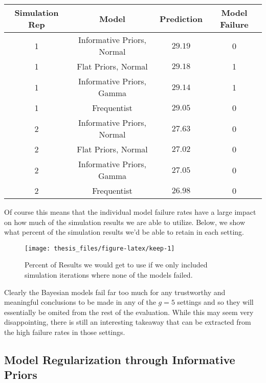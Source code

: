 \documentclass[12pt,twoside]{reedthesis}
\begin{document}
\captionsetup[table]{labelformat=empty,skip=1pt}
\begin{longtable}{cccc}
\toprule
Simulation Rep & Model & Prediction & Model Failure \\ 
\midrule
1 & Informative Priors, Normal & $29.19$ & 0 \\ 
1 & Flat Priors, Normal & $29.18$ & 1 \\ 
1 & Informative Priors, Gamma & $29.14$ & 1 \\ 
1 & Frequentist & $29.05$ & 0 \\ 
2 & Informative Priors, Normal & $27.63$ & 0 \\ 
2 & Flat Priors, Normal & $27.02$ & 0 \\ 
2 & Informative Priors, Gamma & $27.05$ & 0 \\ 
2 & Frequentist & $26.98$ & 0 \\ 
\bottomrule
\end{longtable}
Of course this means that the individual model failure rates have a large impact on how much of the simulation results we are able to utilize. Below, we show what percent of the simulation results we'd be able to retain in each setting.
\begin{figure}

{\centering \texttt{[image: thesis\_files/figure-latex/keep-1]} 

}

\caption{Percent of Results we would get to use if we only included simulation iterations where none of the models failed.}\label{fig:keep}
\end{figure}
Clearly the Bayesian models fail far too much for any trustworthy and meaningful conclusions to be made in any of the \(g = 5\) settings and so they will essentially be omited from the rest of the evaluation. While this may seem very disappointing, there is still an interesting takeaway that can be extracted from the high failure rates in those settings.

\hypertarget{model-regularization-through-informative-priors}{%
\subsection{Model Regularization through Informative Priors}\label{model-regularization-through-informative-priors}}
\end{document}
